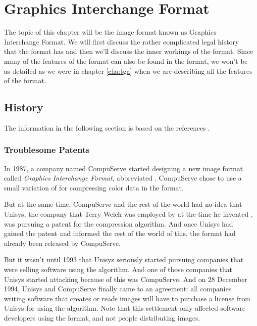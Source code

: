 \begin{comment}
  
\end{comment}

\chapter{Graphics Interchange Format}
\label{cha:gif}

The topic of this chapter will be the image format known as Graphics
Interchange Format. We will first discuss the rather complicated legal
history that the format has and then we'll discuss the inner workings
of the format. Since many of the features of the \tga format can also
be found in the \gif format, we won't be as detailed as we were in
chapter \ref{cha:tga} when we are describing all the features of the
\gif format.

\section{History}
\label{sec:gif-history}

The information in the following section is based on the references
\cite{welch85:_u,roelofs09:_histor_portab_networ_graph_png_format,battilana:_gif_contr,caie:_sad,roelofs99:_png}.


\subsection{Troublesome Patents}

\newcommand{\compus}{CompuServe\xspace}

In 1987, a company named \compus started designing a new image format
called \textit{Graphics Interchange Format}, abbreviated \gif. \compus
chose to use a small variation of \lzw for compressing color data in
the \gif format.

But at the same time, \compus and the rest of the world had no idea
that Unisys, the company that Terry Welch was employed by at the time
he invented \lzw, was pursuing a patent for the \lzw compression
algorithm. And once Unisys had gained the patent and informed the rest
of the world of this, the \gif format had already been released by
\compus.

But it wasn't until 1993 that Unisys seriously started pursuing
companies that were selling software using the \lzw algorithm. And one
of those companies that Unisys started attacking because of this was
\compus. And on 28 December 1994, Unisys and \compus finally came to
an agreement: all companies writing software that creates or reads \gif
images will have to purchase a license from Unisys for using the \lzw
algorithm. Note that this settlement only affected software developers using the
\gif format, and not people distributing \gif images.

